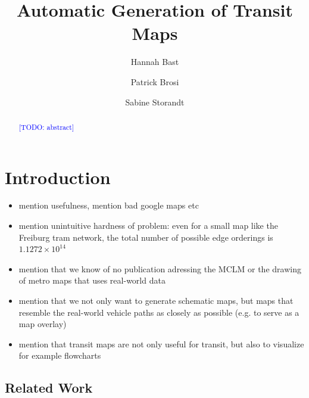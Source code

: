 \documentclass{llncs}
\newcommand\todo[1]{\textcolor{blue}{[TODO: #1]}}
\begin{document}
%
\mainmatter
%
\title{Automatic Generation of Transit Maps}
%
%
\author{Hannah Bast \and Patrick Brosi \and
Sabine Storandt}
%
%
%

\maketitle

\begin{abstract}
	\todo{abstract}
\end{abstract}


%
\section{Introduction}\label{SEC:intro}
%

\begin{itemize}
	\item mention usefulness, mention bad google maps etc
	\item mention unintuitive hardness of problem: even for a small map like the Freiburg tram network, the total number of possible edge orderings is $1.1272 \times 10^{14}$
	\item mention that we know of no publication adressing the MCLM or the drawing of metro maps that uses real-world data
	\item mention that we not only want to generate schematic maps, but maps that resemble the real-world vehicle paths as closely as possible (e.g. to serve as a map overlay)
	\item mention that transit maps are not only useful for transit, but also to visualize for example flowcharts
\end{itemize}

%
\subsection{Related Work}\label{SEC:related}
%
\end{document}
